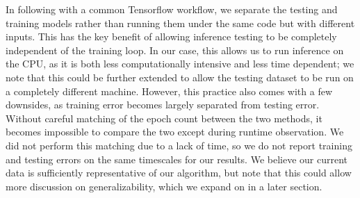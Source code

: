 In following with a common Tensorflow workflow, we separate the testing and training models rather than running them under the same code but with different inputs.
This has the key benefit of allowing inference testing to be completely independent of the training loop.
In our case, this allows us to run inference on the CPU, as it is both less computationally intensive and less time dependent; we note that this could be further extended to allow the testing dataset to be run on a completely different machine.
However, this practice also comes with a few downsides, as training error becomes largely separated from testing error.
Without careful matching of the epoch count between the two methods, it becomes impossible to compare the two except during runtime observation.
We did not perform this matching due to a lack of time, so we do not report training and testing errors on the same timescales for our results.
We believe our current data is sufficiently representative of our algorithm, but note that this could allow more discussion on generalizability, which we expand on in a later section.